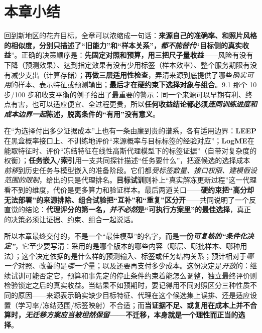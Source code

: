 \FloatBarrier
\section{本章小结}
\label{sec:ket-reuse-summary}

回到新地区的花卉目标，全章可以浓缩成一句话：\textbf{来源自己的准确率、和照片风格的相似度，分别只描述了“旧能力”和“样本关系”，\emph{都不能替代}“目标侧的真实收益}”。正确的决策顺序是：\textbf{先固定对照和预算，用三把尺子量收益}——风险有没有下降（预测效果）、达到指定效果有没有少用标签（样本效率）、整个服务期限有没有减少支出（计算存储）；\textbf{再做三层适用性检查}，弄清来源到底提供了哪些\emph{确实可用}的样本、表示特征或预测输出；\textbf{最后才在硬约束下选择对象与组合}。9.1 那个 10 步/100 步和收支平衡的例子给出了最重要的警示：同一个来源可以早期有利、终点有害，也可以适应便宜、全过程更贵，所以\textbf{任何收益结论都必须\emph{连同训练进度和成本边界一起}陈述，脱离条件的“有用”没有意义}。

在“为选择付出多少证据成本”上也有一条由廉到贵的谱系，各有适用边界：\textbf{LEEP}在黑盒概率接口上、不训练地评价“来源概率与目标标签的经验对应”；\textbf{LogME}在能取特征时、评价“冻结特征在线性高斯代理模型下的标签证据”（自带对复杂度的权衡）；\textbf{任务嵌入/索引}用一支共同探针描述“任务要什么”，把逐候选的选择成本\emph{前移}到历史任务与模型嵌入的准备阶段。它们都\emph{受标签数量、接口权限、建模假设范围的限制}，给出的只是代理排名。\textbf{目标试训}则补上“真实解冻更新过程”这一代理看不到的维度，代价是更多算力和验证样本。最后两道关口——\textbf{硬约束把“高分却无法部署”的来源排除、组合试验把“互补”和“重复”区分开}——共同说明了一个反直觉的结论：\textbf{代理评分的第一名，\emph{并不必然}是“可执行方案里”的最佳选择}，真正的决策必须让证据、约束、组合一起说话。

所以本章最终交付的，不是一个“最佳模型”的名字，而是\textbf{一份\emph{可复核的“条件化决定”}}，它至少要写清：采用的是哪个版本的哪些内容（哪层、哪批样本、哪种用法）；这个决定依据的是什么样的预测输入、标签或任务结构关系；预计相对于\emph{哪一个}对照、改善的是\emph{哪一个}量；以及还要再支付多少成本。这份决定是\emph{开放}的：继续试训可能否定它，预算和事先定的停止条件约束着能怎么调整，独立最终评价则检验锁定之后的真实收益。当结果不如预期时，要记得用不同对照区分三种性质不同的原因——来源表示确实缺少目标特征、代理在这个候选集上误排、还是适应设置（学习率/冻结范围/标签映射）不合适；而\textbf{当证据不足、或复用在成本上并不合算时，\emph{无迁移方案应当被坦然保留}——不迁移，本身就是一个理性而正当的选择}。
